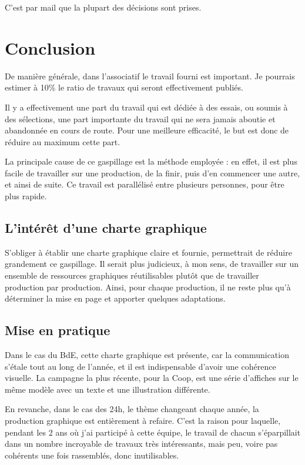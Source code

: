         C'est par mail que la plupart des décisions sont prises.
        
\section{Conclusion}

    De manière générale, dans l'associatif le travail fourni est important. Je pourrais estimer à 10\% le ratio de travaux qui seront effectivement publiés.

    Il y a effectivement une part du travail qui est dédiée à des essais, ou soumis à des sélections, une part importante du travail qui ne sera jamais aboutie et abandonnée en cours de route. Pour une meilleure efficacité, le but est donc de réduire au maximum cette part.

    La principale cause de ce gaspillage est la méthode employée : en effet, il est plus facile de travailler sur une production, de la finir, puis d'en commencer une autre, et ainsi de suite. Ce travail est parallélisé entre plusieurs personnes, pour être plus rapide.

    \subsection{L'intérêt d'une charte graphique}
    
        S'obliger à établir une charte graphique claire et fournie, permettrait de réduire grandement ce gaspillage.
        Il serait plus judicieux, à mon sens, de travailler sur un ensemble de ressources graphiques réutilisables plutôt que de travailler production par production.
        Ainsi, pour chaque production, il ne reste plus qu'à déterminer la mise en page et  apporter quelques adaptations.

    \subsection{Mise en pratique}

        Dans le cas du BdE, cette charte graphique est présente, car la communication s'étale tout au long de l'année, et il est indispensable d'avoir une cohérence visuelle.
        La campagne la plus récente, pour la Coop, est une série d'affiches sur le même modèle avec un texte et une illustration différente.
        
        En revanche, dans le cas des 24h,  le thème changeant chaque année, la production graphique est entièrement à refaire.
        C'est la raison pour laquelle, pendant les 2 ans où j'ai participé à cette équipe, le travail de chacun s'éparpillait dans un nombre incroyable de travaux très intéressants, mais peu, voire pas cohérents une fois rassemblés, donc inutilisables.
        
